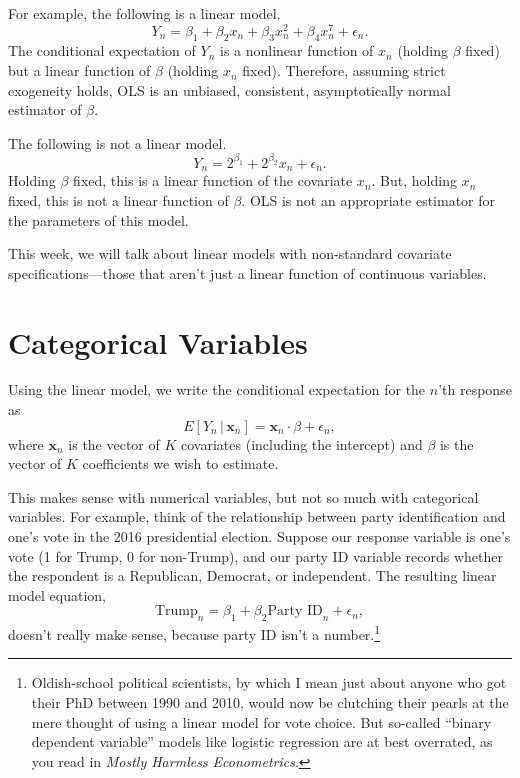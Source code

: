 \documentclass[12pt,oneside,openany]{book}
\let\rmarkdownfootnote\footnote%
\def\footnote{\protect\rmarkdownfootnote}
\begin{document}
For example, the following is a linear model. \[
Y_n = \beta_1 + \beta_2 x_n + \beta_3 x_n^2 + \beta_4 x_n^7 + \epsilon_n.
\] The conditional expectation of \(Y_n\) is a nonlinear function of
\(x_n\) (holding \(\beta\) fixed) but a linear function of \(\beta\)
(holding \(x_n\) fixed). Therefore, assuming strict exogeneity holds,
OLS is an unbiased, consistent, asymptotically normal estimator of
\(\beta\).

The following is not a linear model. \[
Y_n = 2^{\beta_1} + 2^{\beta_2} x_n + \epsilon_n.
\] Holding \(\beta\) fixed, this is a linear function of the covariate
\(x_n\). But, holding \(x_n\) fixed, this is not a linear function of
\(\beta\). OLS is not an appropriate estimator for the parameters of
this model.

This week, we will talk about linear models with non-standard covariate
specifications---those that aren't just a linear function of continuous
variables.

\section{Categorical Variables}\label{categorical-variables}

Using the linear model, we write the conditional expectation for the
\(n\)'th response as \[
E[Y_n \,|\, \mathbf{x}_n] = \mathbf{x}_n \cdot \beta + \epsilon_n,
\] where \(\mathbf{x}_n\) is the vector of \(K\) covariates (including
the intercept) and \(\beta\) is the vector of \(K\) coefficients we wish
to estimate.

This makes sense with numerical variables, but not so much with
categorical variables. For example, think of the relationship between
party identification and one's vote in the 2016 presidential election.
Suppose our response variable is one's vote (1 for Trump, 0 for
non-Trump), and our party ID variable records whether the respondent is
a Republican, Democrat, or independent. The resulting linear model
equation, \[
\text{Trump}_n = \beta_1 + \beta_2 \text{Party ID}_n + \epsilon_n,
\] doesn't really make sense, because party ID isn't a number.\footnote{Oldish-school
  political scientists, by which I mean just about anyone who got their
  PhD between 1990 and 2010, would now be clutching their pearls at the
  mere thought of using a linear model for vote choice. But so-called
  ``binary dependent variable'' models like logistic regression are at
  best overrated, as you read in \emph{Mostly Harmless Econometrics}.}
\end{document}
